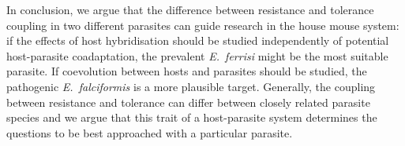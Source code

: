 In conclusion, we argue that the difference between resistance and tolerance coupling in two different parasites can guide research in the house mouse system: if the effects of host hybridisation should be studied independently of potential host-parasite coadaptation, the prevalent \textit{E.~ferrisi} might be the most suitable parasite. If coevolution between hosts and parasites should be studied, the pathogenic \textit{E.~falciformis} is a more plausible target. Generally, the coupling between resistance and tolerance can differ between closely related parasite species and we argue that this trait of a host-parasite system determines the questions to be best approached with a particular parasite. 


